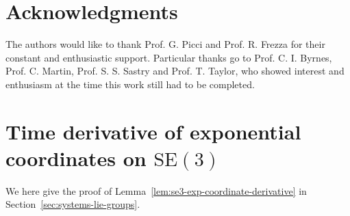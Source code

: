 \documentclass[11pt]{article}
\newcommand{\SE}{\mathrm{SE}}
\begin{document}
\section*{Acknowledgments}
The authors would like to thank Prof. G. Picci and Prof. R. Frezza for their constant and enthusiastic support. Particular thanks go to Prof. C. I. Byrnes, Prof. C. Martin, Prof. S. S. Sastry and Prof. T. Taylor, who showed interest and enthusiasm at the time this work still had to be completed.


\appendix
\section{Time derivative of exponential coordinates on $\SE(3)$}\label{app:se3-exp-derivative}
We here give the proof of Lemma~\ref{lem:se3-exp-coordinate-derivative} in Section~\ref{sec:systems-lie-groups}.
\end{document}

